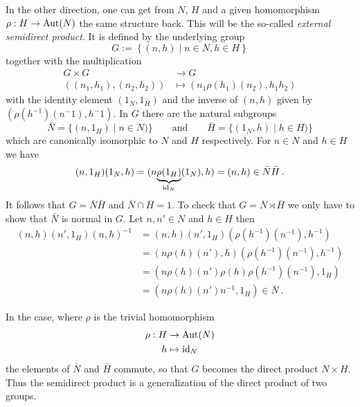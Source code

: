 In the other direction, one can get from $N$, $H$ and a given homomorphism 
$\rho:H\to\operatorname{Aut}(N)$ the same structure back. This will be the so-called
\emph{external semidirect product}. It is defined by the underlying group
\[
  G:=\left\{(n,h)\mid n\in N,h\in H\right\}
\]
together with the multiplication
\begin{align*}
  G\times G&\to G
\\\left((n_1,h_1),(n_2,h_2)\right)&\mapsto(n_1\rho(h_1)(n_2),h_1h_2)
\end{align*}
with the identity element $(1_N,1_H)$ and the inverse of $(n,h)$ given by
$(\rho(h^{-1})(n^-1),h^-1)$. In $G$ there are the natural subgroups
\[
  \bar N=\{(n,1_H)\mid n\in N)\}
  \qquad\text{and}\qquad
  \bar H=\{(1_N,h)\mid h\in H)\}
\]
which are canonically isomorphic to $N$ and $H$ respectively. For $n\in N$ and
$h\in H$ we have
\[
  (n,1_H)(1_N,h)=(n\underset{\operatorname{id}_N}{\underbrace{\rho(1_H)}}(1_N),h)
  =(n,h)\in \bar N\bar H \,.
\]
It follows that $G=\bar N\bar H$ and $\bar N\cap\bar H=1$. To check that
$G=\bar N\rtimes\bar H$ we only have to show that $\bar N$ is normal in $G$.
Let $n,n'\in N$ and $h\in H$ then
\begin{align*}
  (n,h)(n',1_H)(n,h)^{-1}
  &=(n,h)(n',1_H)(\rho(h^{-1})(n^{-1}),h^{-1})
  \\&=(n\rho(h)(n'),h)(\rho(h^{-1})(n^{-1}),h^{-1})
  \\&=(n\rho(h)(n')\rho(h)\rho(h^{-1})(n^{-1}),1_H)
  \\&=(n\rho(h)(n')n^{-1},1_H) \in \bar N \,.
\end{align*}

In the case, where $\rho$ is the trivial homomorphism
\begin{align*}
  \rho:H&\to\operatorname{Aut}(N)
\\h&\mapsto \operatorname{id}_N
\end{align*}
the elements of $\bar N$ and $\bar H$ commute, so that $G$ becomes the direct
product $N\times H$. Thus the semidirect product is a generalization of the
direct product of two groups.



